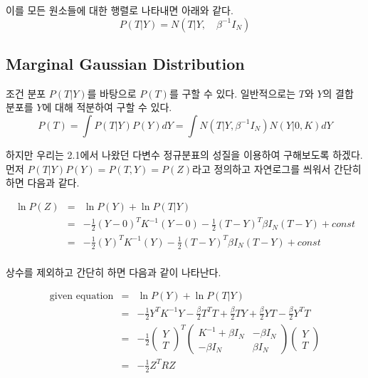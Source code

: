 \documentclass[a4paper]{oblivoir}
\begin{document}
이를 모든 원소들에 대한 행렬로 나타내면 아래와 같다.\\

\begin{equation}
P(T| Y) =N(T | Y, \quad \beta^{-1}I_{N})
\label{eq:12-23}
\end{equation} 

\subsection{Marginal Gaussian Distribution }
조건 분포 $P(T|Y)$를 바탕으로 $P(T)$를 구할 수 있다. 일반적으로는 $T$와 $Y$의 결합 분포를 $Y$에 대해 적분하여 구할 수 있다.\\
\begin{equation}
P(T) = \int P(T|Y)P(Y)dY =\int N(T|Y,\beta^{-1}I_{N})N(Y|0,K)dY
\label{eq:12-24}
\end{equation} 

하지만 우리는 2.1에서 나왔던 다변수 정규분표의 성질을 이용하여 구해보도록 하겠다. 먼저 $P(T|Y)P(Y) = P(T,Y) = P(Z)$라고 정의하고 자연로그를 씌워서 간단히 하면 다음과 같다.

\begin{eqnarray}
\ln P(Z) & = & \ln P(Y) + \ln P(T|Y)\nonumber\\
& = & -\frac{1}{2}(Y-0)^{T}K^{-1}(Y-0) -\frac{1}{2}(T-Y)^{T}\beta I_{N}(T-Y) +const \nonumber\\
& = & -\frac{1}{2}(Y)^{T}K^{-1}(Y) -\frac{1}{2}(T-Y)^{T}\beta I_{N}(T-Y) +const \nonumber\\
\label{eq:12-25}
\end{eqnarray} 

상수를 제외하고 간단히 하면 다음과 같이 나타난다.

\begin{eqnarray}
\textrm{given equation} & = & \ln P(Y) + \ln P(T|Y)\nonumber\\
& = & -\frac{1}{2}Y^{T}K^{-1}Y -\frac{\beta}{2}T^{T}T +\frac{\beta}{2}TY +\frac{\beta}{2}YT -\frac{\beta}{2}Y^{T}T \nonumber\\
& = & -\frac{1}{2} \begin{pmatrix} Y \\  T \end{pmatrix}^{T} \begin{pmatrix} K^{-1} + \beta I_{N} & -\beta I_{N} \\ -\beta I_{N} & \beta I_{N} \end{pmatrix}\begin{pmatrix} Y \\ T \end{pmatrix}\nonumber\\
& = & -\frac{1}{2}Z^{T}RZ \nonumber \\
\label{eq:12-26}
\end{eqnarray} 
\end{document}
